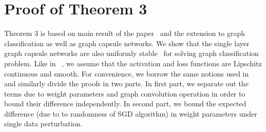 \documentclass{article}
\begin{document}
\section{Proof of Theorem 3}

Theorem 3 is based on main result of the paper~\cite{verma2019stability} and the extension to graph classification as well as graph capsule networks. We  show that the single layer graph capsule networks are also uniformly stable~\cite{bousquet2002stability} for solving  graph  classification problem. Like in ~\cite{verma2019stability}, we assume that the activation and loss functions are Lipschitz continuous and smooth. For convenience, we borrow the same notions used in~\cite{verma2019stability}   and  similarly divide the proofs in two parts. In first part, we separate out the  terms due to  weight parameters and graph convolution operation in order to bound their difference   independently. In second part, we bound the expected difference (due to   to randomness of SGD algorithm) in weight parameters  under single data perturbation. 
\end{document}
